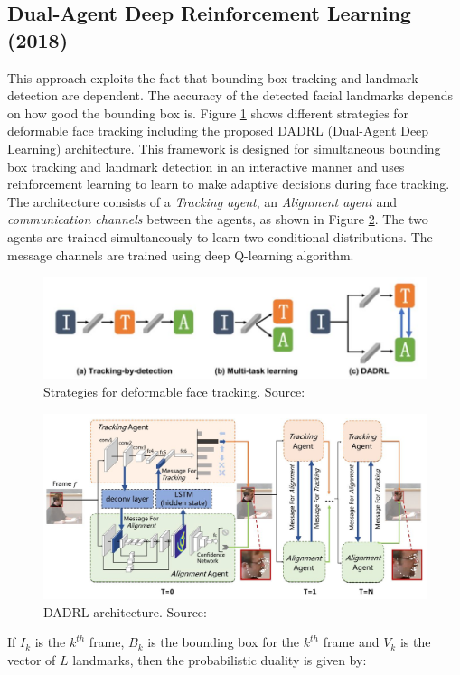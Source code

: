 \documentclass{llncs}
\begin{document}
	\subsection{Dual-Agent Deep Reinforcement Learning (2018) \cite{dadrl}}
	This approach exploits the fact that bounding box tracking and landmark detection are dependent. The accuracy of the detected facial landmarks depends on how good the bounding box is.
	Figure \ref{deformable_face_tracking} shows different strategies for deformable face tracking including the proposed DADRL (Dual-Agent Deep Learning) architecture. This framework is designed for simultaneous bounding box tracking and landmark detection in an interactive manner and uses reinforcement learning to learn to make adaptive decisions during face tracking. The architecture consists of a \textit{Tracking agent}, an \textit{Alignment agent} and \textit{communication channels} between the agents, as shown in Figure \ref{dadrl_architecture}. The two agents are trained simultaneously to learn two conditional distributions. The message channels are trained using deep Q-learning algorithm.
	
	\begin{figure}
		\centering
		\vspace{-7mm}
		\includegraphics[scale=0.5]{Media/deformable_face_tracking}
		\vspace{-3mm}
		\caption{Strategies for deformable face tracking. Source:\cite{dadrl}}
		\label{deformable_face_tracking}
		\vspace{-3mm}
	\end{figure}
	\vspace{-1mm}
	\begin{figure}
		\centering
		\includegraphics[scale=0.5]{Media/DADRL}
		\vspace{-3mm}
		\caption{DADRL architecture. Source:\cite{dadrl}}
		\label{dadrl_architecture}
		\vspace{-3mm}
	\end{figure}
	\vspace{-1mm}
	If $I_k$ is the $k^{th}$ frame, $B_k$ is the bounding box for the $k^{th}$ frame and $V_k$ is the vector of $L$ landmarks, then the probabilistic duality is given by:
	
\end{document}
